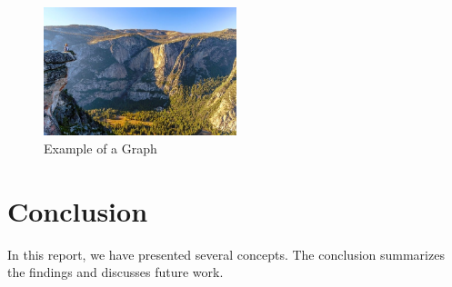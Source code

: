 \documentclass[a4paper, 12pt]{report} %
\begin{document}
\begin{figure}[h] %
\centering
\includegraphics[width=0.5\textwidth]{image2.jpg} %
\caption{Example of a Graph}
\end{figure}

\chapter{Conclusion} %
In this report, we have presented several concepts. The conclusion summarizes the findings and discusses future work.
\end{document}
